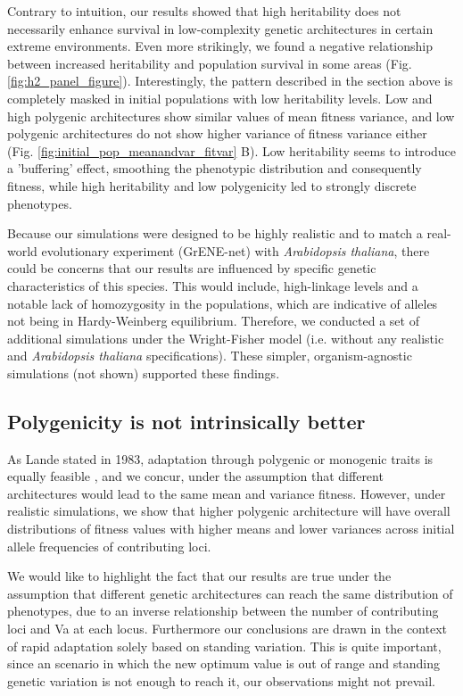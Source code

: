 \documentclass{article}
\begin{document}
Contrary to intuition, our results showed that high heritability does not necessarily enhance survival in low-complexity genetic architectures in certain extreme environments. Even more strikingly, we found a negative relationship between increased heritability and population survival in some areas (Fig. \ref{fig:h2_panel_figure}). Interestingly, the pattern described in the section above is completely masked in initial populations with low heritability levels. Low and high polygenic architectures show similar values of mean fitness variance, and low polygenic architectures do not show higher variance of fitness variance either (Fig. \ref{fig:initial_pop_meanandvar_fitvar} B). Low heritability seems to introduce a 'buffering' effect, smoothing the phenotypic distribution and consequently fitness, while high heritability and low polygenicity led to strongly discrete phenotypes. 

Because our simulations were designed to be highly realistic and to match a real-world evolutionary experiment (GrENE-net) with \textit{Arabidopsis thaliana}, there could be concerns that our results are influenced by specific genetic characteristics of this species. This would include, high-linkage levels and a notable lack of homozygosity in the populations, which are indicative of alleles not being in Hardy-Weinberg equilibrium. Therefore, we conducted a set of additional simulations under the Wright-Fisher model (i.e. without any realistic and  \textit{Arabidopsis thaliana} specifications). These simpler, organism-agnostic simulations (not shown) supported these findings. 

\subsection{Polygenicity is not intrinsically better}

As Lande stated in 1983, adaptation through polygenic or monogenic traits is equally feasible \citep{Lande1983-kz}, and we concur, under the assumption that different architectures would lead to the same mean and variance fitness. However, under realistic simulations, we show that higher polygenic architecture will have overall distributions of fitness values with higher means and lower variances across initial allele frequencies of contributing loci. 


We would like to highlight the fact that our results are true under the assumption that different genetic architectures can reach the same distribution of phenotypes, due to an inverse relationship between the number of contributing loci and Va at each locus. Furthermore our conclusions are drawn in the context of rapid adaptation solely based on standing variation. This is quite important, since an scenario in which the new optimum value is out of range and standing genetic variation is not enough to reach it, our observations might not prevail. 
\end{document}

